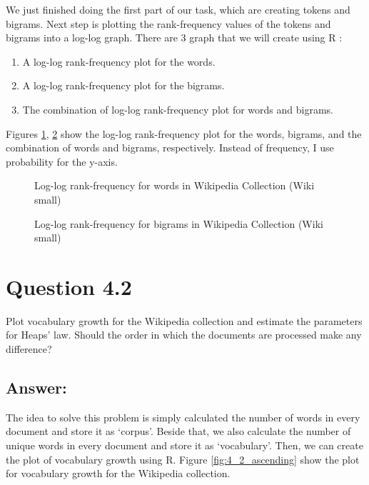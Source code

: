 \documentclass[letterpaper,11pt]{article}
\begin{document}
We just finished doing the first part of our task, which are creating tokens and bigrams. Next step is plotting the rank-frequency values of the tokens and bigrams into a log-log graph. There are 3 graph that we will create using R \cite{r-project}:
\begin{enumerate}
\item A log-log rank-frequency plot for the words.
\item A log-log rank-frequency plot for the bigrams.
\item The combination of log-log rank-frequency plot for words and bigrams. 
\end{enumerate}

Figures \ref{fig:4_1_rank_freq_plot}, \ref{fig:4_1_rank_freq_bigram_plot} show the log-log rank-frequency plot for the words, bigrams, and the combination of words and bigrams, respectively. Instead of frequency, I use probability for the y-axis. 

\begin{figure}[H]
	\centering
	\caption{Log-log rank-frequency for words in Wikipedia Collection (Wiki small)}
	\label{fig:4_1_rank_freq_plot}
\end{figure}

\begin{figure}[H]
	\centering
	\caption{Log-log rank-frequency for bigrams in Wikipedia Collection (Wiki small)}
	\label{fig:4_1_rank_freq_bigram_plot}
\end{figure}

\noindent\makebox[\linewidth]{\rule{\textwidth}{0.4pt}}

\section*{Question 4.2}
\begin{spverbatim}
Plot vocabulary growth for the Wikipedia collection and estimate the parameters for Heaps’ law. Should the order in which the documents are processed make any difference?
\end{spverbatim}

\subsection*{Answer:}
The idea to solve this problem is simply calculated the number of words in every document and store it as `corpus'. Beside that, we also calculate the number of unique words in every document and store it as `vocabulary'. 
Then, we can create the plot of vocabulary growth using R. Figure \ref{fig:4_2_ascending} show the plot for vocabulary growth for the Wikipedia collection. 
\end{document}
